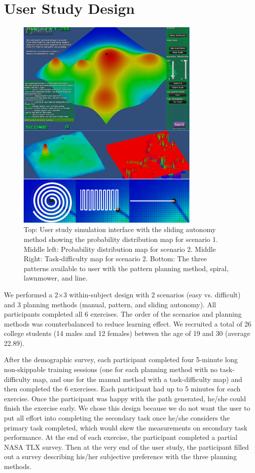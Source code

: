 \documentclass[lettersize, apacite, twoside, HRI]{apa_HRI}
\begin{document}
\section{User Study Design} 
\label{sec:Design}

\begin{figure}
\centering
\includegraphics[width=3.5in]{UserStudy.JPG}
\caption{Top: User study simulation interface with the sliding autonomy method showing the probability distribution map for scenario 1. Middle left: Probability distribution map for scenario 2. Middle Right: Task-difficulty map for scenario 2. Bottom: The three patterns available to user with the pattern planning method, spiral, lawnmower, and line.}
\label{UserStudy}
\end{figure}

We performed a 2$\times$3 within-subject design with 2 scenarios (easy vs. difficult) and 3 planning methods (manual, pattern, and sliding autonomy). All participants completed all 6 exercises. The order of the scenarios and planning methods was counterbalanced to reduce learning effect. We recruited a total of 26 college students (14 males and 12 females) between the age of 19 and 30 (average 22.89). 

After the demographic survey, each participant completed four 5-minute long non-skippable training sessions (one for each planning method with no task-difficulty map, and one for the manual method with a task-difficulty map) and then completed the 6 exercises. Each participant had up to 5 minutes for each exercise. Once the participant was happy with the path generated, he/she could finish the exercise early. We chose this design because we do not want the user to put all effort into completing the secondary task once he/she considers the primary task completed, which would skew the measurements on secondary task performance. At the end of each exercise, the participant completed a partial NASA TLX survey. Then at the very end of the user study, the participant filled out a survey describing his/her subjective preference with the three planning methods.
\end{document}
